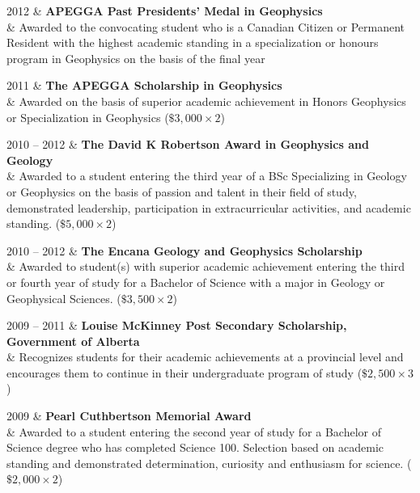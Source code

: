 \documentclass[a4paper, 11pt]{article}
\begin{document}
\begin{entryright}
2012 & \textbf{APEGGA Past Presidents' Medal in Geophysics} \\
& Awarded to the convocating student who is a Canadian Citizen or Permanent Resident with the highest academic standing in a specialization or honours program in Geophysics on the basis of the final year
\end{entryright}

\begin{entryright}
2011 & \textbf{The APEGGA Scholarship in Geophysics} \\
& Awarded on the basis of superior academic achievement in Honors Geophysics or Specialization in Geophysics ($\$3,000 \times 2$)
\end{entryright}

\clearpage
\begin{entryright}
2010 -- 2012 & \textbf{The David K Robertson Award in Geophysics and Geology} \\
& Awarded to a student entering the third year of a BSc Specializing in Geology or Geophysics on the basis of passion and talent in their field of study, demonstrated leadership, participation in extracurricular activities, and academic standing. ($\$5,000 \times 2$)
\end{entryright}

\begin{entryright}
2010 -- 2012 & \textbf{The Encana Geology and Geophysics Scholarship} \\
& Awarded to student(s) with superior academic achievement entering the third or fourth year of study for a Bachelor of Science with a major in Geology or Geophysical Sciences. ($\$3,500 \times 2$)
\end{entryright}

\begin{entryright}
2009 -- 2011 & \textbf{Louise McKinney Post Secondary Scholarship, Government of Alberta} \\
& Recognizes students for their academic achievements at a provincial level and encourages them to continue in their undergraduate program of study ($\$2,500 \times 3$)
\end{entryright}

\begin{entryright}
2009 & \textbf{Pearl Cuthbertson Memorial Award} \\
& Awarded to a student entering the second year of study for a Bachelor of Science degree who has completed Science 100. Selection based on academic standing and demonstrated determination, curiosity and enthusiasm for science. ($\$2,000 \times 2$)
\end{entryright}
\end{document}
